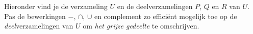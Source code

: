 \newpage
\begin{oef}
Hieronder vind je de verzameling $U$ en de deelverzamelingen $P$, $Q$ en $R$ van $U$. Pas de bewerkingen $-$, $\cap$, $\cup$ en complement zo effici\"ent mogelijk toe op de \emph{deel}verzamelingen van $U$ om \emph{het grijze gedeelte} te omschrijven.
\begin{multicols}{2}
\begin{enumerate}

\begin{minipage}{\columnwidth}
\item
\centering

\end{minipage}

\begin{minipage}{\columnwidth}
\item
\centering

\end{minipage}

\begin{minipage}{\columnwidth}
\item
\centering

\end{minipage}

\begin{minipage}{\columnwidth}
\item
\centering

\end{minipage}

\begin{minipage}{\columnwidth}
\item
\centering

\end{minipage}

\begin{minipage}{\columnwidth}
\item
\centering

\end{minipage}

\end{enumerate}
\end{multicols}


\end{oef}
